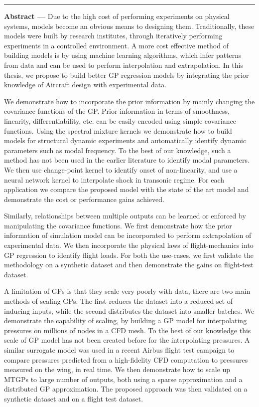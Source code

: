 \noindent\rule[2pt]{\textwidth}{0.5pt}
{\large\textbf{Abstract ---}}
Due to the high cost of performing experiments on physical systems, models become an obvious means to designing them. Traditionally, these models were built by research institutes, through iteratively performing experiments in a controlled environment. A more cost effective method of building models is by using machine learning algorithms, which infer patterns from data and can be used to perform interpolation and extrapolation. In this thesis, we propose to build better GP regression models by integrating the prior knowledge of Aircraft design with experimental data. 

We demonstrate how to incorporate the prior information by mainly changing the covariance functions of the GP. Prior information in terms of smoothness, linearity, differentiability, etc. can be easily encoded using simple covariance functions. Using the spectral mixture kernels we demonstrate how to build models for structural dynamic experiments and automatically identify dynamic parameters such as modal frequency. To the best of our knowledge, such a method has not been used in the earlier literature to identify modal parameters. We then use change-point kernel to identify onset of non-linearity, and use a neural network kernel to interpolate shock in transonic regime. For each application we compare the proposed model with the state of the art model and demonstrate the cost or performance gains achieved. 

Similarly, relationships between multiple outputs can be learned or enforced by manipulating the covariance functions. We first demonstrate how the prior information of simulation model can be incorporated to perform extrapolation of experimental data. We then incorporate the physical laws of flight-mechanics into GP regression to identify flight loads. For both the use-cases, we first validate the methodology on a synthetic dataset and then demonstrate the gains on flight-test dataset.

A limitation of GPs is that they scale very poorly with data, there are two main methods of scaling GPs. The first reduces the dataset into a reduced set of inducing inputs, while the second distributes the dataset into smaller batches. We demonstrate the capability of scaling, by building a GP model for interpolating pressures on millions of nodes in a CFD mesh. To the best of our knowledge this scale of GP model has not been created before for the interpolating pressures. A similar surrogate model was used in a recent Airbus flight test campaign to compare pressures predicted from a high-fidelity CFD computation to pressures measured on the wing, in real time. We then demonstrate how to scale up MTGPs to large number of outputs, both using a sparse approximation and a distributed GP approximation. The proposed approach was then validated on a synthetic dataset and on a flight test dataset.

